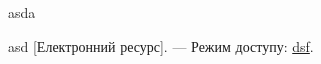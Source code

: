 \begin{thebibliography}
    asda

    asd [Електронний ресурс]. --- Режим доступу: \url{dsf}.


\end{thebibliography}
